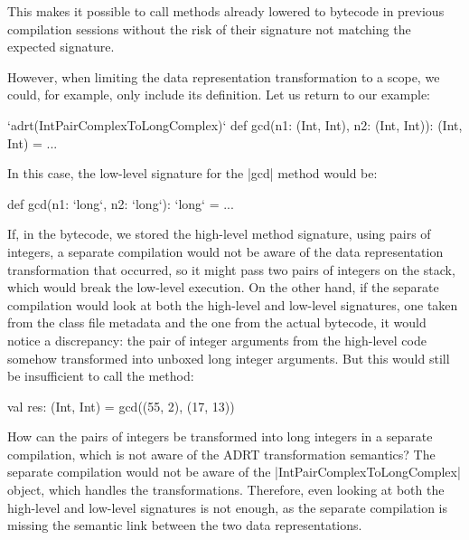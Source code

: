 This makes it possible to call methods already lowered to bytecode in previous compilation sessions without the risk of their signature not matching the expected signature.

However, when limiting the data representation transformation to a scope, we could, for example, only include its definition. Let us return to our example:

\begin{lstlisting-nobreak}
`adrt(IntPairComplexToLongComplex)` {
  def gcd(n1: (Int, Int), n2: (Int, Int)): (Int, Int) = ...
}
\end{lstlisting-nobreak}

In this case, the low-level signature for the |gcd| method would be:

\begin{lstlisting-nobreak}
def gcd(n1: `long`, n2: `long`): `long` = ...
\end{lstlisting-nobreak}

If, in the bytecode, we stored the high-level method signature, using pairs of integers, a separate compilation would not be aware of the data representation transformation that occurred, so it might pass two pairs of integers on the stack, which would break the low-level execution. On the other hand, if the separate compilation would look at both the high-level and low-level signatures, one taken from the class file metadata and the one from the actual bytecode, it would notice a discrepancy: the pair of integer arguments from the high-level code somehow transformed into unboxed long integer arguments. But this would still be insufficient to call the method:

\begin{lstlisting-nobreak}
val res: (Int, Int) = gcd((55, 2), (17, 13))
\end{lstlisting-nobreak}

How can the pairs of integers be transformed into long integers in a separate compilation, which is not aware of the ADRT transformation semantics? The separate compilation would not be aware of the |IntPairComplexToLongComplex| object, which handles the transformations. Therefore, even looking at both the high-level and low-level signatures is not enough, as the separate compilation is missing the semantic link between the two data representations.

